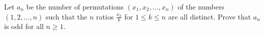 Let $a_n$ be the number of permutations $\left(x_1,x_2,\ldots,x_n\right)$ of the numbers $\left(1,2,\ldots,n\right)$ such that the $n$ ratios $\frac{x_k}{k}$ for $1\leq k\leq n$ are all distinct. Prove that $a_n$ is odd for all $n\geq1$.